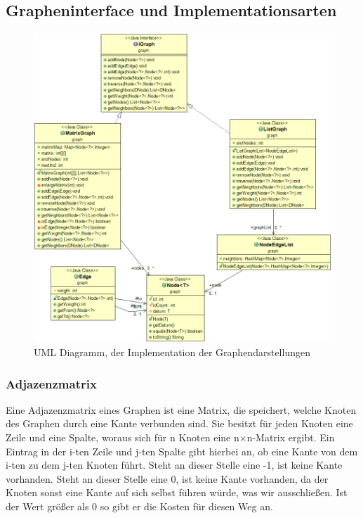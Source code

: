 \documentclass[
   draft=false
  ,paper=a4
  ,twoside=false
  ,fontsize=11pt
  ,headsepline
  ,DIV11
  ,parskip=full+
]{scrartcl} %
\begin{document}
\subsection{Grapheninterface und Implementationsarten}
\begin{figure}[htp]
  	\centering
    \includegraphics[width=\textwidth]{./IMG/graph.png}
    \caption[shortone]{UML Diagramm, der Implementation der Graphendarstellungen}
    \label{fig:plot}
\end{figure}

\subsubsection{Adjazenzmatrix}

Eine Adjazenzmatrix eines Graphen ist eine Matrix, die speichert, welche Knoten des Graphen durch eine Kante verbunden sind. Sie besitzt für jeden Knoten eine Zeile und eine Spalte, woraus sich für n Knoten eine n$\times$n-Matrix ergibt. Ein Eintrag in der i-ten Zeile und j-ten Spalte gibt hierbei an, ob eine Kante von dem i-ten zu dem j-ten Knoten führt. Steht an dieser Stelle eine -1, ist keine Kante vorhanden. Steht an dieser Stelle eine 0, ist keine Kante vorhanden, da der Knoten sonst eine Kante auf sich selbst führen würde, was wir ausschließen. Ist der Wert größer als 0 so gibt er die Kosten für diesen Weg an.
\end{document}
